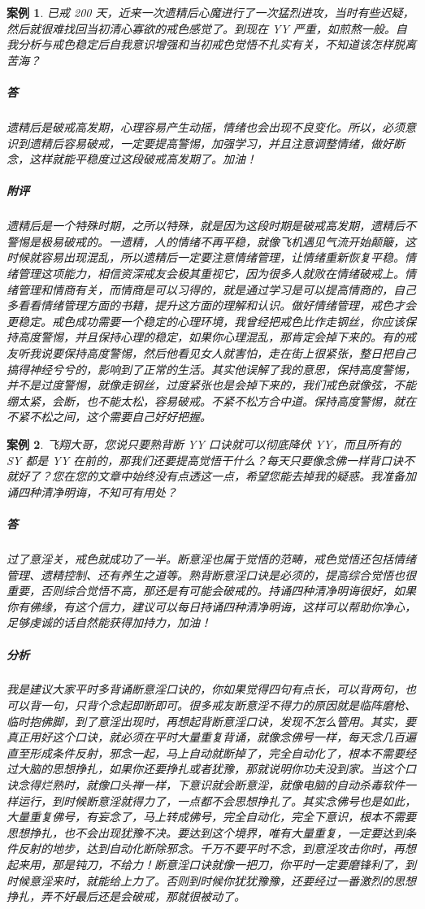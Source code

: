 \documentclass[fontset=founder]{ctexart}
\newtheorem{case}{案例}
\begin{document}
\begin{case}
    已戒 200 天，近来一次遗精后心魔进行了一次猛烈进攻，当时有些迟疑，然后就很难找回当初清心寡欲的戒色感觉了。到现在 YY 严重，如煎熬一般。自我分析与戒色稳定后自我意识增强和当初戒色觉悟不扎实有关，不知道该怎样脱离苦海？
    \subparagraph{答} 遗精后是破戒高发期，心理容易产生动摇，情绪也会出现不良变化。所以，必须意识到遗精后容易破戒，一定要提高警惕，加强学习，并且注意调整情绪，做好断念，这样就能平稳度过这段破戒高发期了。加油！
    \subparagraph{附评}遗精后是一个特殊时期，之所以特殊，就是因为这段时期是破戒高发期，遗精后不警惕是极易破戒的。一遗精，人的情绪不再平稳，就像飞机遇见气流开始颠簸，这时候就容易出现混乱，所以遗精后一定要注意情绪管理，让情绪重新恢复平稳。情绪管理这项能力，相信资深戒友会极其重视它，因为很多人就败在情绪破戒上。情绪管理和情商有关，而情商是可以习得的，就是通过学习是可以提高情商的，自己多看看情绪管理方面的书籍，提升这方面的理解和认识。做好情绪管理，戒色才会更稳定。戒色成功需要一个稳定的心理环境，我曾经把戒色比作走钢丝，你应该保持高度警惕，并且保持心理的稳定，如果你心理混乱，那肯定会掉下来的。有的戒友听我说要保持高度警惕，然后他看见女人就害怕，走在街上很紧张，整日把自己搞得神经兮兮的，影响到了正常的生活。其实他误解了我的意思，保持高度警惕，并不是过度警惕，就像走钢丝，过度紧张也是会掉下来的，我们戒色就像弦，不能绷太紧，会断，也不能太松，容易破戒。不紧不松方合中道。保持高度警惕，就在不紧不松之间，这个需要自己好好把握。
\end{case}

\begin{case}
    飞翔大哥，您说只要熟背断 YY 口诀就可以彻底降伏 YY，而且所有的 SY 都是 YY 在前的，那我们还要提高觉悟干什么？每天只要像念佛一样背口诀不就好了？您在您的文章中始终没有点透这一点，希望您能去掉我的疑惑。我准备加诵四种清净明诲，不知可有用处？
    \subparagraph{答} 过了意淫关，戒色就成功了一半。断意淫也属于觉悟的范畴，戒色觉悟还包括情绪管理、遗精控制、还有养生之道等。熟背断意淫口诀是必须的，提高综合觉悟也很重要，否则综合觉悟不高，那还是有可能会破戒的。持诵四种清净明诲很好，如果你有佛缘，有这个信力，建议可以每日持诵四种清净明诲，这样可以帮助你净心，足够虔诚的话自然能获得加持力，加油！
    \subparagraph{分析} 我是建议大家平时多背诵断意淫口诀的，你如果觉得四句有点长，可以背两句，也可以背一句，只背个念起即断即可。很多戒友断意淫不得力的原因就是临阵磨枪、临时抱佛脚，到了意淫出现时，再想起背断意淫口诀，发现不怎么管用。其实，要真正用好这个口诀，就必须在平时大量重复背诵，就像念佛号一样，每天念几百遍直至形成条件反射，邪念一起，马上自动就断掉了，完全自动化了，根本不需要经过大脑的思想挣扎，如果你还要挣扎或者犹豫，那就说明你功夫没到家。当这个口诀念得烂熟时，就像口头禅一样，下意识就会断意淫，就像电脑的自动杀毒软件一样运行，到时候断意淫就得力了，一点都不会思想挣扎了。其实念佛号也是如此，大量重复佛号，有妄念了，马上转成佛号，完全自动化，完全下意识，根本不需要思想挣扎，也不会出现犹豫不决。要达到这个境界，唯有大量重复，一定要达到条件反射的地步，达到自动化断除邪念。千万不要平时不念，到意淫攻击你时，再想起来用，那是钝刀，不给力！断意淫口诀就像一把刀，你平时一定要磨锋利了，到时候意淫来时，就能给上力了。否则到时候你犹犹豫豫，还要经过一番激烈的思想挣扎，弄不好最后还是会破戒，那就很被动了。
\end{case}
\end{document}

